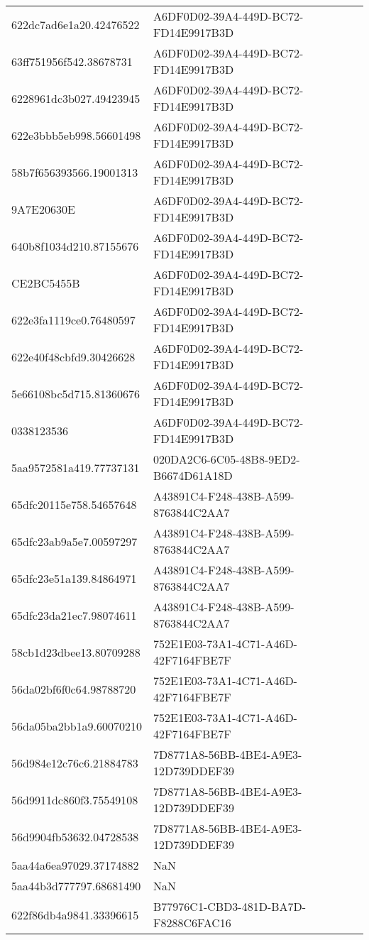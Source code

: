 \begin{tabular}{ll}
622dc7ad6e1a20.42476522 & A6DF0D02-39A4-449D-BC72-FD14E9917B3D \\
63ff751956f542.38678731 & A6DF0D02-39A4-449D-BC72-FD14E9917B3D \\
6228961dc3b027.49423945 & A6DF0D02-39A4-449D-BC72-FD14E9917B3D \\
622e3bbb5eb998.56601498 & A6DF0D02-39A4-449D-BC72-FD14E9917B3D \\
58b7f656393566.19001313 & A6DF0D02-39A4-449D-BC72-FD14E9917B3D \\
9A7E20630E & A6DF0D02-39A4-449D-BC72-FD14E9917B3D \\
640b8f1034d210.87155676 & A6DF0D02-39A4-449D-BC72-FD14E9917B3D \\
CE2BC5455B & A6DF0D02-39A4-449D-BC72-FD14E9917B3D \\
622e3fa1119ce0.76480597 & A6DF0D02-39A4-449D-BC72-FD14E9917B3D \\
622e40f48cbfd9.30426628 & A6DF0D02-39A4-449D-BC72-FD14E9917B3D \\
5e66108bc5d715.81360676 & A6DF0D02-39A4-449D-BC72-FD14E9917B3D \\
0338123536 & A6DF0D02-39A4-449D-BC72-FD14E9917B3D \\
5aa9572581a419.77737131 & 020DA2C6-6C05-48B8-9ED2-B6674D61A18D \\
65dfc20115e758.54657648 & A43891C4-F248-438B-A599-8763844C2AA7 \\
65dfc23ab9a5e7.00597297 & A43891C4-F248-438B-A599-8763844C2AA7 \\
65dfc23e51a139.84864971 & A43891C4-F248-438B-A599-8763844C2AA7 \\
65dfc23da21ec7.98074611 & A43891C4-F248-438B-A599-8763844C2AA7 \\
58cb1d23dbee13.80709288 & 752E1E03-73A1-4C71-A46D-42F7164FBE7F \\
56da02bf6f0c64.98788720 & 752E1E03-73A1-4C71-A46D-42F7164FBE7F \\
56da05ba2bb1a9.60070210 & 752E1E03-73A1-4C71-A46D-42F7164FBE7F \\
56d984e12c76c6.21884783 & 7D8771A8-56BB-4BE4-A9E3-12D739DDEF39 \\
56d9911dc860f3.75549108 & 7D8771A8-56BB-4BE4-A9E3-12D739DDEF39 \\
56d9904fb53632.04728538 & 7D8771A8-56BB-4BE4-A9E3-12D739DDEF39 \\
5aa44a6ea97029.37174882 & NaN \\
5aa44b3d777797.68681490 & NaN \\
622f86db4a9841.33396615 & B77976C1-CBD3-481D-BA7D-F8288C6FAC16 \\

\end{tabular}
